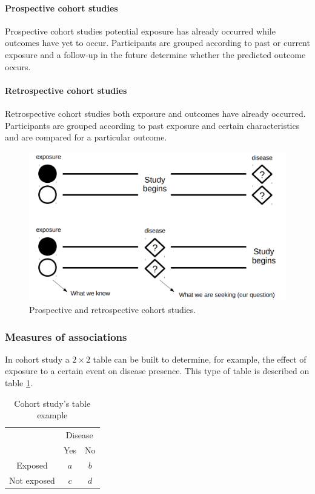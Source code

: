 		\paragraph*{Prospective cohort studies}
		Prospective cohort studies potential exposure has already occurred while outcomes have yet to occur.
		Participants are grouped according to past or current exposure and a follow-up in the future determine whether the predicted outcome occurs.

		\paragraph*{Retrospective cohort studies}
		Retrospective cohort studies both exposure and outcomes have already occurred.
		Participants are grouped according to past exposure and certain characteristics and are compared for a particular outcome.
		
		\begin{figure}[H]
		\centering
		\includegraphics[scale=0.2]{cohort}
		\caption{Prospective and retrospective cohort studies.}
		\end{figure}

		\subsubsection{Measures of associations}
		In cohort study a $2\times 2$ table can be built to determine, for example, the effect of exposure to a certain event on disease presence.
		This type of table is described on table \ref{tab:risk_table}.

		\begin{table}[H]
			\centering
			\begin{tabular}{ccc}
				 & \multicolumn{2}{c}{Disease}\\
				 & Yes & No \\
				 \cline{2-3}
				 Exposed & \multicolumn{1}{|c|}{$a$} & \multicolumn{1}{|c|}{$b$}\\
				 \cline{2-3}
				 Not exposed & \multicolumn{1}{|c|}{$c$} & \multicolumn{1}{|c|}{$d$}\\
				 \cline{2-3}
			\end{tabular}
			\caption{Cohort study's table example}
			\label{tab:risk_table}
		\end{table}
		
